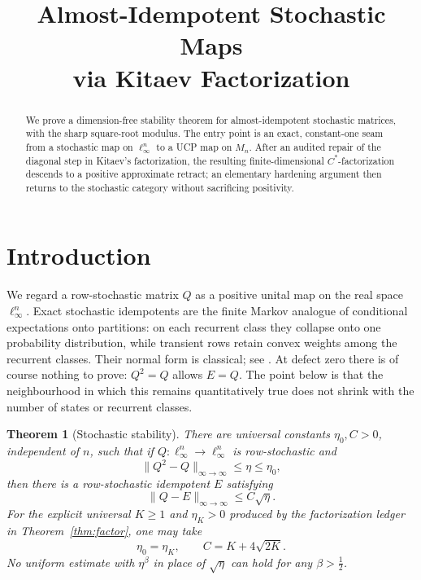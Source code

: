 \documentclass[10pt]{article}
\title{Almost-Idempotent Stochastic Maps\\via Kitaev Factorization}
\author{}
\date{}
\newtheorem{theorem}{Theorem}
\newcommand{\linf}{\ell_\infty}
\newcommand{\norm}[1]{\lVert #1\rVert}
\begin{document}
\maketitle
\vspace{-2.5em}

\begin{abstract}
We prove a dimension-free stability theorem for almost-idempotent stochastic
matrices, with the sharp square-root modulus.  The entry point is an exact,
constant-one seam from a stochastic map on $\linf^n$ to a UCP map on $M_n$.
After an audited repair of the diagonal step in Kitaev's factorization, the
resulting finite-dimensional $C^*$-factorization descends to a positive
approximate retract; an elementary hardening argument then returns to the
stochastic category without sacrificing positivity.
\end{abstract}

\section{Introduction}

We regard a row-stochastic matrix $Q$ as a positive unital map on the real
space $\linf^n$.  Exact stochastic idempotents are the finite Markov analogue
of conditional expectations onto partitions: on each recurrent class they
collapse onto one probability distribution, while transient rows retain
convex weights among the recurrent classes.  Their normal form is classical;
see \cite{HognasMukherjea,BaakeSumner}.  At defect zero there is of course
nothing to prove: $Q^2=Q$ allows $E=Q$.  The point below is that the
neighbourhood in which this remains quantitatively true does not shrink with
the number of states or recurrent classes.

\begin{theorem}[Stochastic stability]\label{thm:main}
There are universal constants $\eta_0,C>0$, independent of $n$, such that if
$Q:\linf^n\to\linf^n$ is row-stochastic and
\[
  \norm{Q^2-Q}_{\infty\to\infty}\leq \eta\leq\eta_0,
\]
then there is a row-stochastic idempotent $E$ satisfying
\[
  \norm{Q-E}_{\infty\to\infty}\leq C\sqrt\eta.
\]
For the explicit universal $K\geq1$ and $\eta_K>0$ produced by the
factorization ledger in Theorem~\ref{thm:factor}, one may take
\[
  \eta_0=\eta_K,\qquad C=K+4\sqrt{2K}.
\]
No uniform estimate with $\eta^\beta$ in place of $\sqrt\eta$ can hold for
any $\beta>\tfrac12$.
\end{theorem}\footnotemark
{}
\end{document}
